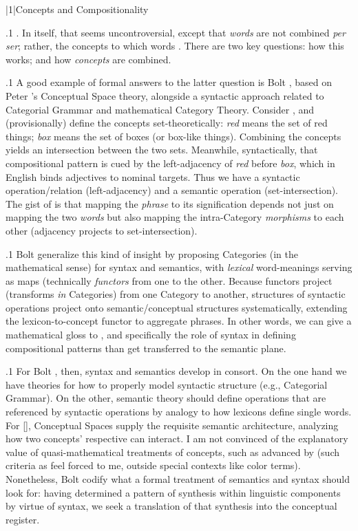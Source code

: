 \documentclass[11pt, twocolumn]{article}
\begin{document}
\s|1|{Concepts and Compositionality}

\p.1{%
.  In itself, that seems uncontroversial,
except that \textit{words} are not combined \textit{per ser}; rather,
the concepts to which words .  There are two
key questions: how this  works; and how
\textit{concepts} are combined.
} %

\p.1{%
A good example of formal answers to the latter question is
Bolt \etal{} , based on Peter \Gardenfors{}'s Conceptual Space
theory, alongside a syntactic approach related to Categorial Grammar
and mathematical Category Theory.  Consider , and
(provisionally) define the concepts set-theoretically:
\textit{red} means the set of red things; \textit{box} means the set of
boxes (or box-like things).  Combining the concepts yields
an intersection between the two sets.  Meanwhile,
syntactically, that compositional pattern is cued by the left-adjacency of
\textit{red} before \textit{box}, which in English binds
adjectives to nominal targets.  Thus we have a
syntactic operation/relation (left-adjacency) and a
semantic operation (set-intersection).  The gist
of  is that mapping the \textit{phrase} to its signification
depends not just on mapping the two \textit{words} but also
mapping the intra-Category \textit{morphisms} to each other (adjacency
projects to set-intersection).
} %

\p.1{%
Bolt \etal{} generalize this kind of insight by proposing
Categories (in the mathematical sense) for syntax and semantics,
with \textit{lexical} word-meanings serving as maps (technically
\textit{functors} from one to the other.  Because functors
project  (transforms \textit{in} Categories) from one Category
to another, structures of syntactic operations
project onto semantic/conceptual structures systematically,
extending the lexicon-to-concept functor to aggregate
phrases.  In other words, we can give a mathematical gloss
to , and specifically the role of
syntax in defining compositional patterns than get transferred
to the semantic plane.
} %

\p.1{%
For Bolt \etal{}, then, syntax and semantics develop in consort.  On the
one hand we have theories for how to properly model syntactic
structure (e.g., Categorial Grammar).  On the other, semantic theory
should define operations that are referenced by syntactic operations
by analogy to how lexicons define single words.  For [], Conceptual Spaces
supply the requisite semantic architecture, analyzing how
two concepts' respective  can interact.  I am not convinced
of the explanatory value of
quasi-mathematical treatments of concepts, such as
advanced by \Gardenfors{} (such criteria as 
feel forced to me, outside special contexts like color terms).
Nonetheless, Bolt \etal{} codify what a formal treatment
of semantics and syntax should look for: having determined
a pattern of synthesis within linguistic components by
virtue of syntax, we seek a translation of that
synthesis into the conceptual register.
} %
\end{document}
